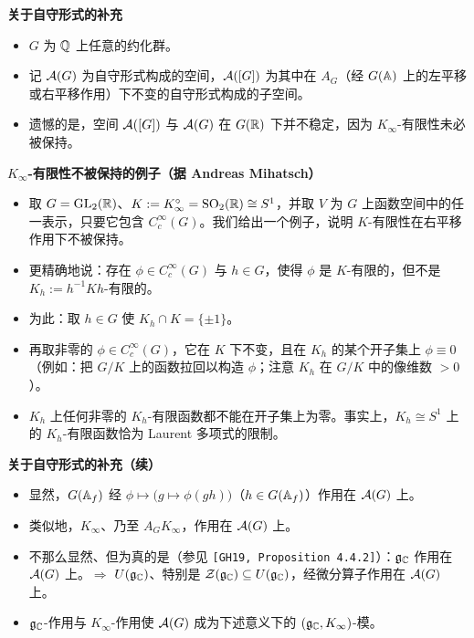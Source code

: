 \medskip
\noindent\textbf{关于自守形式的补充}
\begin{itemize}
\item $G$ 为 $\mathbb{Q}$ 上任意的约化群。
\item 记 $\mathcal{A}(G)$ 为自守形式构成的空间，$\mathcal{A}([G])$ 为其中在 $A_G$（经 $G(\mathbb{A})$ 上的左平移或右平移作用）下不变的自守形式构成的子空间。
\item 遗憾的是，空间 $\mathcal{A}([G])$ 与 $\mathcal{A}(G)$ 在 $G(\mathbb{R})$ 下并不稳定，因为 $K_\infty$-有限性未必被保持。
\end{itemize}

\medskip
\noindent\textbf{$K_\infty$-有限性不被保持的例子（据 Andreas Mihatsch）}
\begin{itemize}
\item 取 $G=\operatorname{GL}_2(\mathbb{R})$、$K:=K_\infty^\circ=\operatorname{SO}_2(\mathbb{R})\cong S^1$，并取 $V$ 为 $G$ 上函数空间中的任一表示，只要它包含 $C_c^\infty(G)$。我们给出一个例子，说明 $K$-有限性在右平移作用下不被保持。
\item 更精确地说：存在 $\phi\in C_c^\infty(G)$ 与 $h\in G$，使得 $\phi$ 是 $K$-有限的，但不是 $K_h:=h^{-1}Kh$-有限的。
\item 为此：取 $h\in G$ 使 $K_h\cap K=\{\pm1\}$。
\item 再取非零的 $\phi\in C_c^\infty(G)$，它在 $K$ 下不变，且在 $K_h$ 的某个开子集上 $\phi\equiv0$（例如：把 $G/K$ 上的函数拉回以构造 $\phi$；注意 $K_h$ 在 $G/K$ 中的像维数 $>0$）。
\item $K_h$ 上任何非零的 $K_h$-有限函数都不能在开子集上为零。事实上，$K_h\cong S^1$ 上的 $K_h$-有限函数恰为 Laurent 多项式的限制。
\end{itemize}

\medskip
\noindent\textbf{关于自守形式的补充（续）}
\begin{itemize}
\item 显然，$G(\mathbb{A}_f)$ 经 $\phi\mapsto\bigl(g\mapsto\phi(gh)\bigr)$（$h\in G(\mathbb{A}_f)$）作用在 $\mathcal{A}(G)$ 上。
\item 类似地，$K_\infty$、乃至 $A_GK_\infty$，作用在 $\mathcal{A}(G)$ 上。
\item 不那么显然、但为真的是（参见 \texttt{[GH19, Proposition 4.4.2]}）：$\mathfrak{g}_{\mathbb{C}}$ 作用在 $\mathcal{A}(G)$ 上。$\Rightarrow$ $U(\mathfrak{g}_{\mathbb{C}})$、特别是 $\mathcal{Z}(\mathfrak{g}_{\mathbb{C}})\subseteq U(\mathfrak{g}_{\mathbb{C}})$，经微分算子作用在 $\mathcal{A}(G)$ 上。
\item $\mathfrak{g}_{\mathbb{C}}$-作用与 $K_\infty$-作用使 $\mathcal{A}(G)$ 成为下述意义下的 $(\mathfrak{g}_{\mathbb{C}},K_\infty)$-模。
\end{itemize}


